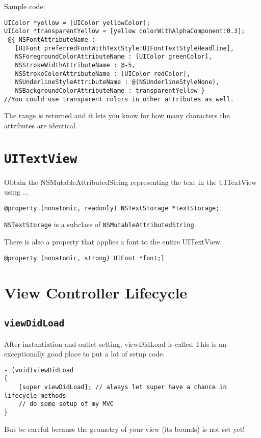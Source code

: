 \documentclass[12pt]{article}
\newcommand{\co}{\texttt}
\begin{document}
Sample code:

\begin{lstlisting}
UIColor *yellow = [UIColor yellowColor];
UIColor *transparentYellow = [yellow colorWithAlphaComponent:0.3];
 @{ NSFontAttributeName :
   [UIFont preferredFontWithTextStyle:UIFontTextStyleHeadline],
   NSForegroundColorAttributeName : [UIColor greenColor],
   NSStrokeWidthAttributeName : @-5,
   NSStrokeColorAttributeName : [UIColor redColor],
   NSUnderlineStyleAttributeName : @(NSUnderlineStyleNone),
   NSBackgroundColorAttributeName : transparentYellow }
//You could use transparent colors in other attributes as well.
\end{lstlisting}

The range is returned and it lets you know for how many characters the attributes are identical.

\section{\co{UITextView}}
Obtain the NSMutableAttributedString representing the text in the UITextView using ...

\begin{lstlisting}
@property (nonatomic, readonly) NSTextStorage *textStorage;
\end{lstlisting}

\co{NSTextStorage} is a subclass of \co{NSMutableAttributedString}.

There is also a property that applies a font to the entire UITextView: 

\begin{lstlisting}
@property (nonatomic, strong) UIFont *font;}
\end{lstlisting}

\newpage

\section{View Controller Lifecycle}
\subsection{\co{viewDidLoad}}
After instantiation and outlet-setting, viewDidLoad is called This is an exceptionally good place to put a lot of setup code.
\begin{lstlisting}
- (void)viewDidLoad
{
	[super viewDidLoad]; // always let super have a chance in lifecycle methods
	// do some setup of my MVC
}
\end{lstlisting}
But be careful because the geometry of your view (its bounds) is not set yet!
\end{document}
